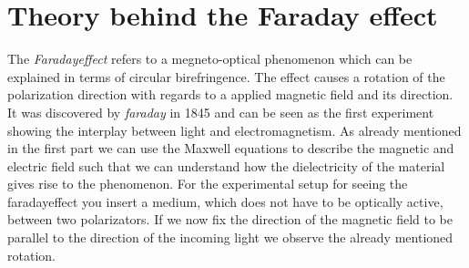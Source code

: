 \section{Theory behind the Faraday effect}
The \textit{Faradayeffect} refers to a megneto-optical phenomenon which can be explained in terms
of circular birefringence. The effect causes a rotation of the polarization direction with regards
to a applied magnetic field and its direction. It was discovered by \textit{faraday} in 1845 and
can be seen as the first experiment showing the interplay between light and electromagnetism. 
As already mentioned in the first part we can use the Maxwell equations to describe the magnetic
and electric field such that we can understand how the dielectricity of the material gives rise
to the phenomenon. For the experimental setup for seeing the faradayeffect you insert a medium,
which does not have to be optically active, between two polarizators. If we now fix the direction
of the magnetic field to be parallel to the direction of the incoming light we observe the 
already mentioned rotation.   
